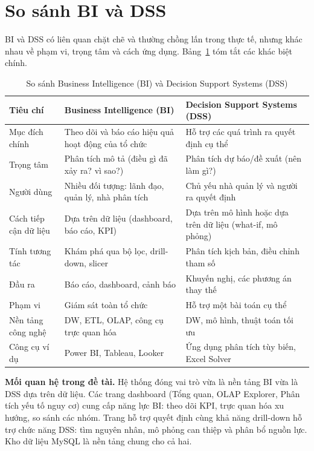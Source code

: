 \section{So sánh BI và DSS}
BI và DSS có liên quan chặt chẽ và thường chồng lấn trong thực tế, nhưng khác nhau về phạm vi, trọng tâm và cách ứng dụng. Bảng~\ref{tab:bi_dss} tóm tắt các khác biệt chính.
\begin{table}[H]
\renewcommand{\arraystretch}{1.35}\setlength{\extrarowheight}{3pt}
\centering
\caption{So sánh Business Intelligence (BI) và Decision Support Systems (DSS)}\label{tab:bi_dss}
\small
\begin{tabularx}{\textwidth}{|p{2.7cm}|X|X|}
\hline
\textbf{Tiêu chí} & \textbf{Business Intelligence (BI)} & \textbf{Decision Support Systems (DSS)} \\ \hline
Mục đích chính & Theo dõi và báo cáo hiệu quả hoạt động của tổ chức & Hỗ trợ các quá trình ra quyết định cụ thể \\ \hline
Trọng tâm & Phân tích mô tả (điều gì đã xảy ra? vì sao?) & Phân tích dự báo/đề xuất (nên làm gì?) \\ \hline
Người dùng & Nhiều đối tượng: lãnh đạo, quản lý, nhà phân tích & Chủ yếu nhà quản lý và người ra quyết định \\ \hline
Cách tiếp cận dữ liệu & Dựa trên dữ liệu (dashboard, báo cáo, KPI) & Dựa trên mô hình hoặc dựa trên dữ liệu (what-if, mô phỏng) \\ \hline
Tính tương tác & Khám phá qua bộ lọc, drill-down, slicer & Phân tích kịch bản, điều chỉnh tham số \\ \hline
Đầu ra & Báo cáo, dashboard, cảnh báo & Khuyến nghị, các phương án thay thế \\ \hline
Phạm vi & Giám sát toàn tổ chức & Hỗ trợ một bài toán cụ thể \\ \hline
Nền tảng công nghệ & DW, ETL, OLAP, công cụ trực quan hóa & DW, mô hình, thuật toán tối ưu \\ \hline
Công cụ ví dụ & Power BI, Tableau, Looker & Ứng dụng phân tích tùy biến, Excel Solver \\ \hline
\end{tabularx}
\end{table}
\textbf{Mối quan hệ trong đề tài.} Hệ thống đóng vai trò vừa là nền tảng BI vừa là DSS dựa trên dữ liệu. Các trang dashboard (Tổng quan, OLAP Explorer, Phân tích yếu tố nguy cơ) cung cấp năng lực BI: theo dõi KPI, trực quan hóa xu hướng, so sánh các nhóm. Trang hỗ trợ quyết định cùng khả năng drill-down hỗ trợ chức năng DSS: tìm nguyên nhân, mô phỏng can thiệp và phân bổ nguồn lực. Kho dữ liệu MySQL là nền tảng chung cho cả hai.

